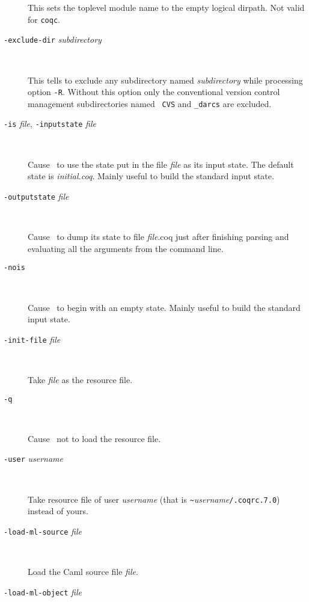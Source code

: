 \begin{description}
  This sets the toplevel module name to the empty logical dirpath. Not
  valid for {\tt coqc}.

\item[{\tt -exclude-dir} {\em subdirectory}]\ 

  This tells to exclude any subdirectory named {\em subdirectory}
  while processing option {\tt -R}. Without this option only the
  conventional version control management subdirectories named {\tt
  CVS} and {\tt \_darcs} are excluded.

\item[{\tt -is} {\em file}, {\tt -inputstate} {\em file}]\ 

  Cause \Coq~to use the state put in the file {\em file} as its input
  state. The default state is {\em initial.coq}.
  Mainly useful to build the standard input state.

\item[{\tt -outputstate} {\em file}]\ 

  Cause \Coq~to dump its state to file {\em file}.coq just after finishing
  parsing and evaluating all the arguments from the command line.

\item[{\tt -nois}]\ 

  Cause \Coq~to begin with an empty state. Mainly useful to build the
  standard input state.

%
%

\item[{\tt -init-file} {\em file}]\ 

  Take {\em file} as the resource file.

\item[{\tt -q}]\ 

  Cause \Coq~not to load the resource file.

\item[{\tt -user} {\em username}]\ 

  Take resource file of user {\em username} (that is 
  \verb+~+{\em username}{\tt /.coqrc.7.0}) instead of yours.

\item[{\tt -load-ml-source} {\em file}]\ 

  Load the Caml source file {\em file}.

\item[{\tt -load-ml-object} {\em file}]\ 


\end{description}
